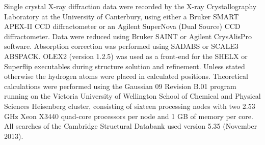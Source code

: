 Single crystal X-ray diffraction data were recorded by the X-ray Crystallography Laboratory at the University of Canterbury, using either a Bruker SMART APEX-II CCD diffractometer or an Agilent SuperNova (Dual Source) CCD diffractometer.  Data were reduced using Bruker SAINT or Agilent CrysAlisPro software.  Absorption correction was performed using SADABS or SCALE3 ABSPACK.  OLEX2 (version 1.2.5)\cite{Olex2} was used as a front-end for the SHELX\cite{Shelx} or Superflip\cite{Superflip} executables during structure solution and refinement.  Unless stated otherwise the hydrogen atoms were placed in calculated positions.  Theoretical calculations were performed using the Gaussian 09 Revision B.01 program\cite{Gaussian09, Gaussian09b} running on the Victoria University of Wellington School of Chemical and Physical Sciences Heisenberg cluster, consisting of sixteen processing nodes with two 2.53 GHz Xeon X3440 quad-core processors per node and 1 GB of memory per core.  All searches of the Cambridge Structural Databank used version 5.35 (November 2013).\cite{Allen2002}




